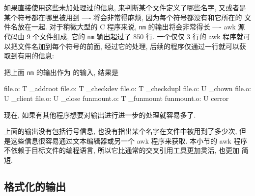 如果直接使用这些未加处理过的信息, 来判断某个文件定义了哪些名字, 又或者是
某个符号都在哪里被用到 ---- 将会非常得麻烦, 因为每个符号都没有和它所在的
文件名放在一起. 对于稍微大型的 C 程序来说, \verb'nm' 的输出将会非常得长
---- awk 源代码由 9 个文件组成, 它的 \verb'nm' 输出超过了 850 行.
一个仅仅 3 行的 awk 程序就可以把文件名加到每个符号的前面, 经过它的处理,
后续的程序仅通过一行就可以获取到有用的信息:
把上面 \verb'nm' 的输出作为  的输入, 结果是
\begin{awkcode}
    file.o: T _addroot
    file.o: T _checkdev
    file.o: T _checkdupl
    file.o: U _chown
    file.o: U _client
    file.o: U _close
    funmount.o: T _funmount
    funmount.o: U cerror
\end{awkcode}
现在, 如果有其他程序想要对输出进行进一步的处理就容易多了.

上面的输出没有包括行号信息, 也没有指出某个名字在文件中被用到了多少次, 
但是这些信息很容易通过文本编辑器或另一个 awk 程序来获取. 本小节的 awk 程序 
不依赖于目标文件的编程语言, 所以它比通常的交叉引用工具更加灵活, 也更加
简短.

\subsection{格式化的输出}
\label{subsec:formatted_output}

